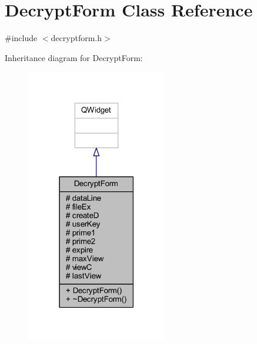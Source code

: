 \hypertarget{class_decrypt_form}{}\section{Decrypt\+Form Class Reference}
\label{class_decrypt_form}


{\ttfamily \#include $<$decryptform.\+h$>$}



Inheritance diagram for Decrypt\+Form\+:
\nopagebreak
\begin{figure}[H]
\begin{center}
\leavevmode
\includegraphics[width=174pt]{class_decrypt_form__inherit__graph}
\end{center}
\end{figure}


